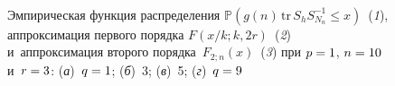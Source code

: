 \begin{figure*}[b] %
  \vspace*{6pt}
  \begin{center}
    \mbox{%
 \epsfxsize=163mm 
 }
\end{center}


{\small Эмпирическая функция распределения $\mathbb{P}\left( g(n) 
\,\mathrm{tr}\,S_h S^{-1}_{N_n} \leq x\right)$~(\textit{1}), аппроксимация 
первого порядка $F\left({x}/{k};k,2r\right)$~(\textit{2}) 
и~аппроксимация второго порядка~$F_{2;n}(x)$~(\textit{3}) при
 $p\hm=1$, $n\hm=10$ и~$r\hm=3$:
 (\textit{а})~$q\hm=1$; (\textit{б})~3; (\textit{в})~5;
 (\textit{г})~$q\hm=9$}
\end{figure*}

